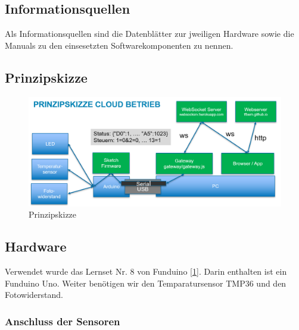 \documentclass[
  ngerman,
  a4paper,
  12pt]{scrartcl}
\begin{document}
\hypertarget{informationsquellen}{%
\subsection{Informationsquellen}\label{informationsquellen}}

Als Informationsquellen sind die Datenblätter zur jweiligen Hardware
sowie die Manuals zu den einsesetzten Softwarekomponenten zu nennen.

\hypertarget{prinzipskizze}{%
\subsection{Prinzipskizze}\label{prinzipskizze}}

\begin{figure}
\centering
\includegraphics{img/prinzipskizze.png}
\caption{Prinzipskizze}
\end{figure}

\hypertarget{hardware}{%
\subsection{Hardware}\label{hardware}}

Verwendet wurde das Lernset Nr. 8 von Funduino
{[}\protect\hyperlink{ref-lernset}{1}{]}. Darin enthalten ist ein
Funduino Uno. Weiter benötigen wir den Temparatursensor TMP36 und den
Fotowiderstand.

\hypertarget{anschluss-der-sensoren}{%
\subsubsection{Anschluss der Sensoren}\label{anschluss-der-sensoren}}
\end{document}
